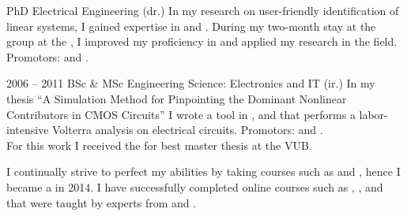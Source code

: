 \documentclass{cv-egeerardyn}
\begin{document}
\begin{education}
  {PhD Electrical Engineering (dr.)}{\VUB}
  {In my research on user-friendly identification of linear systems, I gained expertise in  and . During my two-month stay at the \CST{} group at the \TUe, I improved my proficiency in  and applied my research in the field.
  Promotors: \JohanSchoukens and \TomOomen.}

  \addEducation%
  {2006 -- 2011}
  {BSc \& MSc Engineering Science: Electronics  and IT (ir.)}
  {\VUB}
  {In my thesis ``A Simulation Method for Pinpointing the Dominant Nonlinear Contributors in CMOS Circuits'' I wrote a tool in ,  and  that performs a labor-intensive Volterra analysis on electrical circuits. 
  Promotors: \PietWambacq and \GerdVandersteen.\\
  For this work I received the  for best master thesis at the VUB.}

  {I continually strive to perfect my abilities by taking courses such as 
  and 
  , 
  hence I became a 
  in 2014. 
  I have successfully completed online courses such as 
  , 
  , 
   and 
  that were taught by experts from 
  \Stanford{} and 
  \EPFL{}.}

\end{education}
\end{document}

